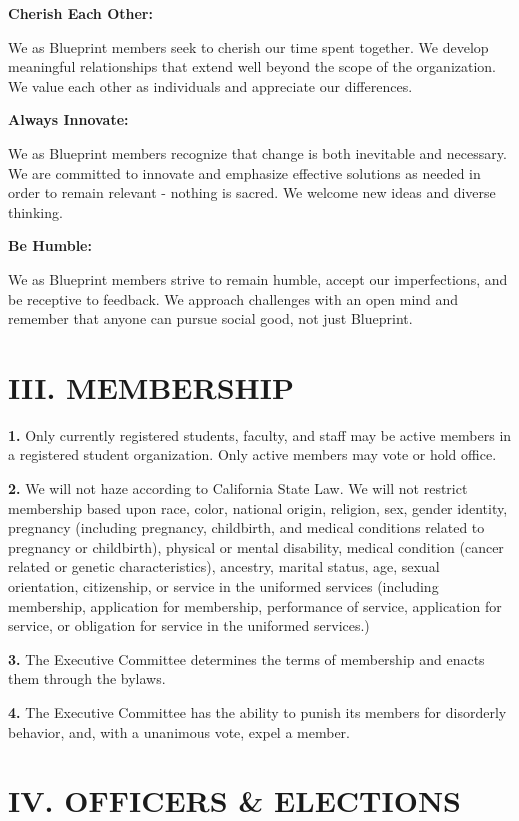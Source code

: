 \documentclass{article}
\begin{document}
\textbf{Cherish Each Other:}

We as Blueprint members seek to cherish our time spent together. We develop meaningful relationships that extend well beyond the scope of the organization. We value each other as individuals and appreciate our differences.

\textbf{Always Innovate:}

We as Blueprint members recognize that change is both inevitable and necessary. We are committed to innovate and emphasize effective solutions as needed in order to remain relevant - nothing is sacred. We welcome new ideas and diverse thinking.

\textbf{Be Humble:}

We as Blueprint members strive to remain humble, accept our imperfections, and be receptive to feedback. We approach challenges with an open mind and remember that anyone can pursue social good, not just Blueprint. 

 
\section{III. MEMBERSHIP}

\textbf{1.} Only currently registered students, faculty, and staff may be active members in a registered student organization. Only active members may vote or hold office.

\textbf{2.} We will not haze according to California State Law. We will not restrict membership based upon race, color, national origin, religion, sex, gender identity, pregnancy (including pregnancy, childbirth, and medical conditions related to pregnancy or childbirth), physical or mental disability, medical condition (cancer related or genetic characteristics), ancestry, marital status, age, sexual orientation, citizenship, or service in the uniformed services (including membership, application for membership, performance of service, application for service, or obligation for service in the uniformed services.)

\textbf{3.} The Executive Committee determines the terms of membership and enacts them through the bylaws. 

\textbf{4.} The Executive Committee has the ability to punish its members for disorderly behavior, and, with a unanimous vote, expel a member.

\section{IV. OFFICERS \& ELECTIONS}
\end{document}
